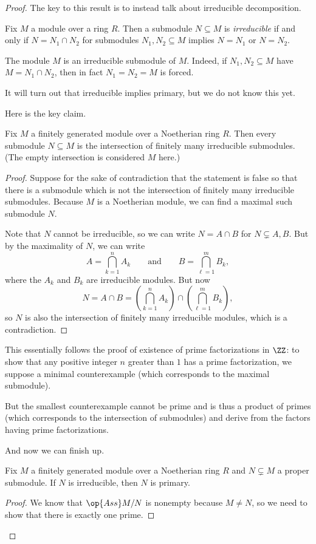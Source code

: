 \documentclass[../notes.tex]{subfiles}
\begin{document}
\begin{proof}
	The key to this result is to instead talk about irreducible decomposition.
	\begin{definition}[Irreducible]
		Fix $M$ a module over a ring $R$. Then a submodule $N\subseteq M$ is \textit{irreducible} if and only if $N=N_1\cap N_2$ for submodules $N_1,N_2\subseteq M$ implies $N=N_1$ or $N=N_2$.
	\end{definition}
	\begin{example} \label{ex:totalisirred}
		The module $M$ is an irreducible submodule of $M$. Indeed, if $N_1,N_2\subseteq M$ have $M=N_1\cap N_2$, then in fact $N_1=N_2=M$ is forced.
	\end{example}
	It will turn out that irreducible implies primary, but we do not know this yet.

	Here is the key claim.
	\begin{lemma}
		Fix $M$ a finitely generated module over a Noetherian ring $R$. Then every submodule $N\subseteq M$ is the intersection of finitely many irreducible submodules. (The empty intersection is considered $M$ here.)
	\end{lemma}
	\begin{proof}
		Suppose for the sake of contradiction that the statement is false so that there is a submodule which is not the intersection of finitely many irreducible submodules. Because $M$ is a Noetherian module, we can find a maximal such submodule $N$.

		Note that $N$ cannot be irreducible, so we can write $N=A\cap B$ for $N\subsetneq A,B$. But by the maximality of $N$, we can write
		\[A=\bigcap_{k=1}^nA_k\qquad\text{and}\qquad B=\bigcap_{\ell=1}^mB_k,\]
		where the $A_k$ and $B_k$ are irreducible modules. But now
		\[N=A\cap B=\left(\bigcap_{k=1}^nA_k\right)\cap\left(\bigcap_{\ell=1}^mB_k\right),\]
		so $N$ is also the intersection of finitely many irreducible modules, which is a contradiction.
	\end{proof}
	\begin{remark}[Nir]
		This essentially follows the proof of existence of prime factorizations in $\ZZ$: to show that any positive integer $n$ greater than $1$ has a prime factorization, we suppose a minimal counterexample (which corresponds to the maximal submodule).
		
		But the smallest counterexample cannot be prime and is thus a product of primes (which corresponds to the intersection of submodules) and derive from the factors having prime factorizations.
	\end{remark}
	And now we can finish up.
	\begin{lemma}
		Fix $M$ a finitely generated module over a Noetherian ring $R$ and $N\subsetneq M$ a proper submodule. If $N$ is irreducible, then $N$ is primary.
	\end{lemma}
	\begin{proof}
		We know that $\op{Ass}M/N$ is nonempty because $M\ne N$, so we need to show that there is exactly one prime.
		

\end{proof}
\end{proof}
\end{document}
